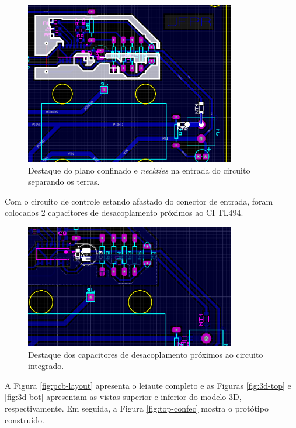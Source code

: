 \documentclass[a4paper]{article}
\begin{document}
{\begin{figure}[H]
	\centering
	\includegraphics[width=0.82\textwidth]{pcb-ground-plane-net-tail.png}
	\caption{Destaque do plano confinado e \emph{neckties} na entrada do circuito separando os terras.}
	\label{fig:plano-baixa}
\end{figure}

Com o circuito de controle estando afastado do conector de entrada, foram colocados 2 capacitores de desacoplamento próximos ao CI TL494.

\begin{figure}[H]
	\centering
	\includegraphics[width=0.82\textwidth]{pcb-caps-desacopl.png}
	\caption{Destaque dos capacitores de desacoplamento próximos ao circuito integrado.}
	\label{fig:caps-des}
\end{figure}

A Figura \ref{fig:pcb-layout} apresenta o leiaute completo e as Figuras \ref{fig:3d-top} e \ref{fig:3d-bot} apresentam as vistas superior e inferior do modelo 3D, respectivamente. Em seguida, a Figura \ref{fig:top-confec} mostra o protótipo construído.

}
\end{document}
